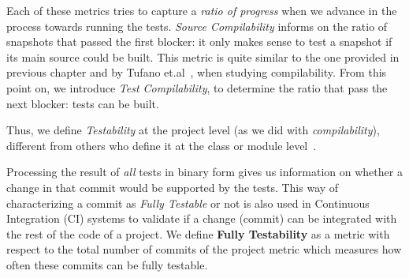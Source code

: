 Each of these metrics tries to capture a \textit{ratio of progress} when we advance in the process towards running the tests. \textit{Source Compilability} informs on the ratio of snapshots that passed the first blocker: it only makes sense to test a snapshot if its main source could be built. This metric is quite similar to the one provided in previous chapter and by Tufano et.al~\cite{tufano2017there}, when studying compilability. From this point on, we introduce \textit{Test Compilability}, to determine the ratio that pass the next blocker: tests can be built.

Thus, we define \textit{Testability} at the project level (as we did with \textit{compilability}), different from others who define it at the class or module level~\cite{bruntink2006empirical}.

Processing the result of \textit{all} tests in binary form gives us information on whether a change in that commit would be supported by the tests. 
This way of characterizing a commit as \textit{Fully Testable} or not is also used in Continuous Integration (CI) systems to validate if a change (commit) can be integrated with the rest of the code of a project.
We define \textbf{Fully Testability} as a metric with respect to the total number of commits of the project metric which measures how often these commits can be fully testable.

